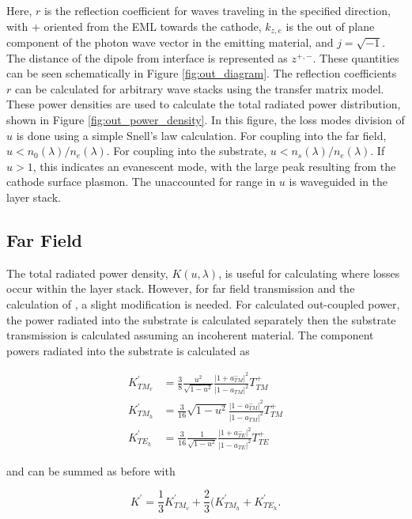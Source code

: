 \documentclass[../thesis.tex]{subfiles}
\begin{document}
Here, $r$ is the reflection coefficient for waves traveling in the specified direction, with $+$ oriented from the EML towards the cathode, $k_{z,e}$ is the out of plane component of the photon wave vector in the emitting material, and $j=\sqrt{-1}$.
The distance of the dipole from interface is represented as $z^{+,-}$.
These quantities can be seen schematically in Figure \ref{fig:out_diagram}.
The reflection coefficients $r$ can be calculated for arbitrary wave stacks using the transfer matrix model.\supercite{Pettersson1999}
These power densities are used to calculate the total radiated power distribution, shown in Figure \ref{fig:out_power_density}.
In this figure, the loss modes division of $u$ is done using a simple Snell's law calculation.
For coupling into the far field, $u<n_0(\lambda)/n_e(\lambda)$.
For coupling into the substrate, $u<n_s(\lambda)/n_e(\lambda)$.
If $u>1$, this indicates an evanescent mode, with the large peak resulting from the cathode surface plasmon.
The unaccounted for range in $u$ is waveguided in the layer stack.

\subsection{Far Field}

The total radiated power density, $K(u,\lambda)$, is useful for calculating where losses occur within the layer stack.  
However, for far field transmission and the calculation of \oc, a slight modification is needed.
For calculated out-coupled power, the power radiated into the substrate is calculated separately then the substrate transmission is calculated assuming an incoherent material.
The component powers radiated into the substrate is calculated as

\begin{eqnarray}
K_{TM_v}^\prime &= \frac{3}{8}\frac{u^2}{\sqrt{1-u^2}}\frac{\left|1+a_{TM}^-\right|^2}{\left|1-a_{TM}\right|^2}T_{TM}^+ \\
K_{TM_h}^\prime &= \frac{3}{16}\sqrt{1-u^2}\frac{\left|1-a_{TM}^-\right|^2}{\left|1-a_{TM}\right|^2}T_{TM}^+ \\
K_{TE_h}^\prime &= \frac{3}{16}\frac{1}{\sqrt{1-u^2}}\frac{\left|1+a_{TE}^-\right|^2}{\left|1-a_{TE}\right|^2}T_{TE}^+
\end{eqnarray}

and can be summed as before with

\begin{equation}
K^\prime=\frac{1}{3}K^\prime_{TM_v}+\frac{2}{3}(K^\prime_{TM_h}+K^\prime_{TE_h}.
\end{equation}
\end{document}
